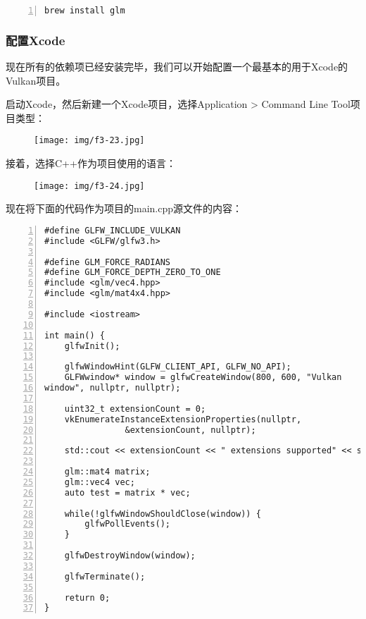 \documentclass{ctexart}
\begin{document}
\begin{lstlisting}[language={bash},keywordstyle=\color{blue!70},commentstyle=\color{red!50!green!50!blue!50},frame=shadowbox, rulesepcolor=\color{red!20!green!20!blue!20},basicstyle=\small,numbers=left, numberstyle=\tiny,breaklines=true]
brew install glm
\end{lstlisting}

\subsubsection{配置Xcode}

现在所有的依赖项已经安装完毕，我们可以开始配置一个最基本的用于Xcode的Vulkan项目。

启动Xcode，然后新建一个Xcode项目，选择Application > Command Line Tool项目类型：

\begin{figure}[H]
	\centering
	\texttt{[image: img/f3-23.jpg]}
\end{figure}

接着，选择C++作为项目使用的语言：

\begin{figure}[H]
	\centering
	\texttt{[image: img/f3-24.jpg]}
\end{figure}

现在将下面的代码作为项目的main.cpp源文件的内容：

\begin{lstlisting}[language={[ANSI]C},keywordstyle=\color{blue!70},commentstyle=\color{red!50!green!50!blue!50},frame=shadowbox, rulesepcolor=\color{red!20!green!20!blue!20},basicstyle=\small,numbers=left, numberstyle=\tiny,breaklines=true]
#define GLFW_INCLUDE_VULKAN
#include <GLFW/glfw3.h>

#define GLM_FORCE_RADIANS
#define GLM_FORCE_DEPTH_ZERO_TO_ONE
#include <glm/vec4.hpp>
#include <glm/mat4x4.hpp>

#include <iostream>

int main() {
	glfwInit();

	glfwWindowHint(GLFW_CLIENT_API, GLFW_NO_API);
	GLFWwindow* window = glfwCreateWindow(800, 600, "Vulkan
window", nullptr, nullptr);

	uint32_t extensionCount = 0;
	vkEnumerateInstanceExtensionProperties(nullptr,
				&extensionCount, nullptr);

	std::cout << extensionCount << " extensions supported" << std::endl;

	glm::mat4 matrix;
	glm::vec4 vec;
	auto test = matrix * vec;

	while(!glfwWindowShouldClose(window)) {
		glfwPollEvents();
	}

	glfwDestroyWindow(window);

	glfwTerminate();

	return 0;
}
\end{lstlisting}
\end{document}

